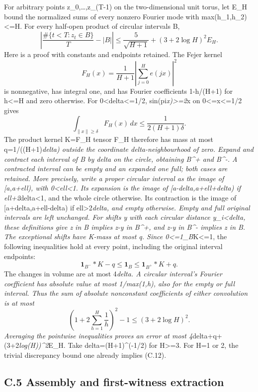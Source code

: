 \documentclass[11pt,a4paper]{article}
\begin{document}
For arbitrary points z\_0,\ldots,z\_(T-1) on the two-dimensional unit
torus, let E\_H bound the normalized sums of every nonzero Fourier mode
with max(\textbar h\_1\textbar,\textbar h\_2\textbar)\textless=H. For
every half-open product of circular intervals B, \[
\left|\frac{\#\{t<T:z_t\in B\}}T-|B|\right|
\le\frac5{\sqrt{H+1}}+(3+2\log H)^2E_H. \tag{C.12}
\] Here is a proof with constants and endpoints retained. The Fejer
kernel \[
F_H(x)=\frac1{H+1}\left|\sum_{j=0}^H e(jx)\right|^2
\] is nonnegative, has integral one, and has Fourier coefficients
1-\textbar h\textbar/(H+1) for \textbar h\textbar\textless=H and zero
otherwise. For 0\textless delta\textless=1/2,
sin(pi\emph{x)\textgreater=2}x on 0\textless=x\textless=1/2 gives \[
\int_{\|x\|\ge\delta}F_H(x)\,dx
\le\frac1{2(H+1)\delta}.
\] The product kernel K=F\_H tensor F\_H therefore has mass at most
q=1/((H+1)\emph{delta) outside the coordinate delta-neighbourhood of
zero. Expand and contract each interval of B by delta on the circle,
obtaining B\^{}+ and B\^{}-. A contracted interval can be empty and an
expanded one full; both cases are retained. More precisely, write a
proper circular interval as the image of {[}a,a+ell), with
0\textless ell\textless1. Its expansion is the image of
{[}a-delta,a+ell+delta) if ell+2}delta\textless1, and the whole circle
otherwise. Its contraction is the image of {[}a+delta,a+ell-delta) if
ell\textgreater2\emph{delta, and empty otherwise. Empty and full
original intervals are left unchanged. For shifts y with each circular
distance \textbar\textbar y\_i\textbar\textbar\textless delta, these
definitions give z in B implies z-y in B\^{}+, and z-y in B\^{}- implies
z in B. The exceptional shifts have K-mass at most q. Since
0\textless=1\_B}K\textless=1, the following inequalities hold at every
point, including the original interval endpoints: \[
\mathbf1_{B^-}*K-q\le\mathbf1_B\le\mathbf1_{B^+}*K+q.
\] The changes in volume are at most 4\emph{delta. A circular interval's
Fourier coefficient has absolute value at most
1/max(1,\textbar h\textbar), also for the empty or full interval. Thus
the sum of absolute nonconstant coefficients of either convolution is at
most \[
\left(1+2\sum_{h=1}^H\frac1h\right)^2-1
\le(3+2\log H)^2.
\] Averaging the pointwise inequalities proves an error at most
4}delta+q+(3+2\emph{log(H))\^{}2}E\_H. Take delta=(H+1)\^{}(-1/2) for
H\textgreater=3. For H=1 or 2, the trivial discrepancy bound one already
implies (C.12).

\subsection{C.5 Assembly and first-witness
extraction}\label{c.5-assembly-and-first-witness-extraction}
\end{document}
